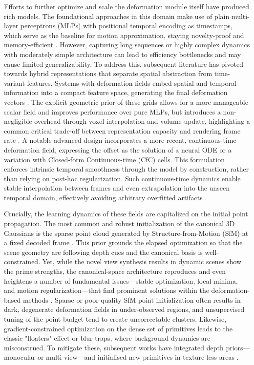 \documentclass[11pt,a4paper]{article}
\begin{document}
Efforts to further optimize and scale the deformation module itself have produced rich models. The foundational approaches in this domain make use of plain multi-layer perceptrons (MLPs) with positional temporal encoding as timestamps, which serve as the baseline for motion approximation, staying novelty-proof and memory-efficient \cite{arxiv:2405.17891v1,arxiv:2311.12897v1}. However, capturing long sequences or highly complex dynamics with moderately simple architecture can lead to efficiency bottlenecks and may cause limited generalizability. To address this, subsequent literature has pivoted towards hybrid representations that separate spatial abstraction from time-variant features. Systems with deformation fields embed spatial and temporal information into a compact feature space, generating the final deformation vectors \cite{arxiv:2412.20720v2}. The explicit geometric prior of these grids allows for a more manageable scalar field and improves performance over pure MLPs, but introduces a non-negligible overhead through voxel interpolation and volume update, highlighting a common critical trade-off between representation capacity and rendering frame rate \cite{arxiv:2606.00452v1}. A notable advanced design incorporates a more recent, continuous-time deformation field, expressing the offset as the solution of a neural ODE or a variation with Closed-form Continuous-time (CfC) cells. This formulation enforces intrinsic temporal smoothness through the model by construction, rather than relying on post-hoc regularization. Such continuous-time dynamics enable stable interpolation between frames and even extrapolation into the unseen temporal domain, effectively avoiding arbitrary overfitted artifacts \cite{arxiv:2405.17891v1,arxiv:2407.17418v1}.

Crucially, the learning dynamics of these fields are capitalized on the initial point propagation. The most common and robust initialization of the canonical 3D Gaussians is the sparse point cloud generated by Structure-from-Motion (SfM) at a fixed decoded frame \cite{arxiv:2409.11307v1}. This prior grounds the elapsed optimization so that the scene geometry are following depth cues and the canonical basis is well-constrained. Yet, while the novel view synthesis results in dynamic scenes show the prime strengths, the canonical-space architecture reproduces and even heightens a number of fundamental issues---stable optimization, local minima, and motion regularization---that find prominent solutions within the deformation-based methods \cite{arxiv:2405.17891v1}. Sparse or poor-quality SfM point initialization often results in dark, degenerate deformation fields in under-observed regions, and unsupervised tuning of the point budget tend to create uncorrectable clusters. Likewise, gradient-constrained optimization on the dense set of primitives leads to the classic "floaters" effect or blur traps, where background dynamics are misconstrued. To mitigate these, subsequent works have integrated depth priors---monocular or multi-view---and initialised new primitives in texture-less areas \cite{arxiv:2305.14570v1,arxiv:2405.17891v1}.
\end{document}
